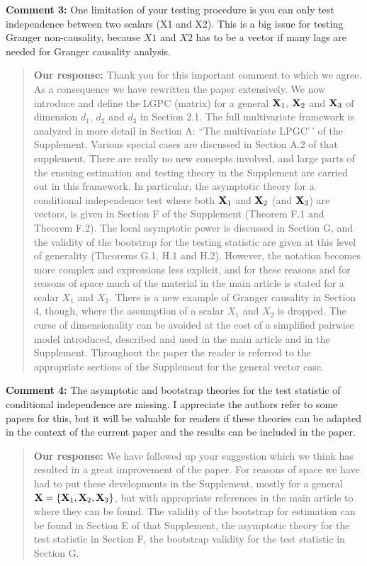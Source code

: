 \documentclass[
  12pt,
  letterpaper]{article}
\numberwithin{equation}{section}
\begin{document}
\textbf{Comment 3:} One limitation of your testing procedure is you can only test independence between two scalars (X1 and X2). This is a big issue for testing Granger non-causality, because \(X1\) and \(X2\) has to be a vector if many lags are needed for Granger causality analysis.

\begin{quote}
\textbf{Our response:} Thank you for this important comment to which we agree. As a consequence we have rewritten the paper extensively. We now introduce and define the LGPC (matrix) for a general \({\bf X}_1\), \({\bf X}_2\) and \({\bf X}_3\) of dimension \(d_1\), \(d_2\) and \(d_3\) in Section 2.1. The full multivariate framework is analyzed in more detail in Section A: ``The multivariate LPGC'\,' of the Supplement. Various special cases are discussed in Section A.2 of that supplement. There are really no new concepts involved, and large parts of the ensuing estimation and testing theory in the Supplement are carried out in this framework. In particular, the asymptotic theory for a conditional independence test where both \({\bf X}_1\) and \({\bf X}_2\) (and \({\bf X}_3\)) are vectors, is given in Section F of the Supplement (Theorem F.1 and Theorem F.2). The local asymptotic power is discussed in Section G, and the validity of the bootstrap for the testing statistic are given at this level of generality (Theorems G.1, H.1 and H.2). However, the notation becomes more complex and expressions less explicit, and for these reasons and for reasons of space much of the material in the main article is stated for a scalar \(X_1\) and \(X_2\). There is a new example of Granger causality in Section 4, though, where the assumption of a scalar \(X_1\) and \(X_2\) is dropped. The curse of dimensionality can be avoided at the cost of a simplified pairwise model introduced, described and used in the main article and in the Supplement. Throughout the paper the reader is referred to the appropriate sections of the Supplement for the general vector case.
\end{quote}

\textbf{Comment 4:} The asymptotic and bootstrap theories for the test statistic of conditional independence are missing. I appreciate the authors refer to some papers for this, but it will be valuable for readers if these theories can be adapted in the context of the current paper and the results can be included in the paper.

\begin{quote}
\textbf{Our response:} We have followed up your suggestion which we think has resulted in a great improvement of the paper. For reasons of space we have had to put these developments in the Supplement, mostly for a general \({\bf X} = \{{\bf X}_1,{\bf X}_2, {\bf X}_3\}\), but with appropriate references in the main article to where they can be found. The validity of the bootstrap for estimation can be found in Section E of that Supplement, the asymptotic theory for the test statistic in Section F, the bootstrap validity for the test statistic in Section G.
\end{quote}
\end{document}
